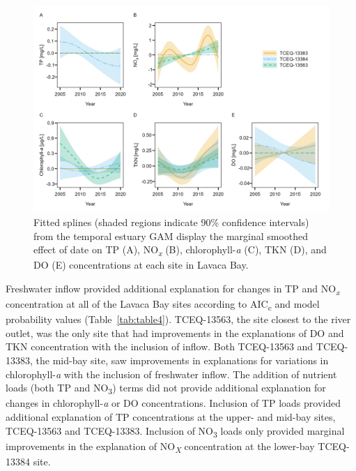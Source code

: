 \documentclass[sn-basic,referee,lineno,pdflatex]{sn-jnl}
\begin{document}
\begin{figure}

{\centering \includegraphics[width=1\linewidth,]{Schramm-2023-05-AS_files/figure-latex/fig5-1} 

}

\caption{Fitted splines (shaded regions indicate 90\% confidence intervals) from the temporal estuary GAM display the marginal smoothed effect of date on TP (A), NO\textit{\textsubscript{x}} (B), chlorophyll-\textit{a} (C), TKN (D), and DO (E) concentrations at each site in Lavaca Bay.}\label{fig:fig5}
\end{figure}

Freshwater inflow provided additional explanation for changes in TP and
NO\textsubscript{\emph{x}} concentration at all of the Lavaca Bay sites
according to AIC\textsubscript{c} and model probability values
(Table~\ref{tab:table4}). TCEQ-13563, the site closest to the river
outlet, was the only site that had improvements in the explanations of
DO and TKN concentration with the inclusion of inflow. Both TCEQ-13563
and TCEQ-13383, the mid-bay site, saw improvements in explanations for
variations in chlorophyll-\emph{a} with the inclusion of freshwater
inflow. The addition of nutrient loads (both TP and NO\textsubscript{3})
terms did not provide additional explanation for changes in
chlorophyll-\emph{a} or DO concentrations. Inclusion of TP loads
provided additional explanation of TP concentrations at the upper- and
mid-bay sites, TCEQ-13563 and TCEQ-13383. Inclusion of
NO\textsubscript{3} loads only provided marginal improvements in the
explanation of NO\textsubscript{\emph{X}} concentration at the lower-bay
TCEQ-13384 site.
\end{document}
